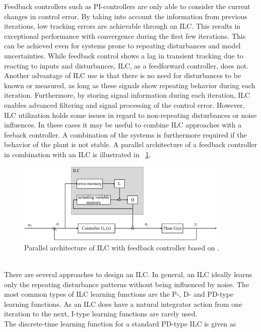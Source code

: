  Feedback controllers such as PI-controllers are only able to consider the current changes in control error. By taking into account the information from previous iterations, low tracking errors are achievable through an ILC. This results in exceptional performance with convergence during the first few iterations. This can be achieved even for systems prone to repeating disturbances and model uncertainties. While feedback control shows a lag in transient tracking due to reacting to inputs and disturbances, ILC, as a feedforward controller, does not. Another advantage of ILC use is that there is no need for disturbances to be known or measured, as long as these signals show repeating behavior during each iteration. Furthermore, by storing signal information during each iteration, ILC enables advanced filtering and signal processing of the control error. However, ILC utilization holds some issues in regard to non-repeating disturbances or noise influences. In these cases it may be useful to combine ILC approaches with a feeback controller. A combination of the systems is furthermore required if the behavior of the plant is not stable. \cite{ILC2} A parallel architecture of a feedback controller in combination with an ILC is illustrated in \figurename~\ref{fig:ILC_parallel}.
 \begin{figure}[ht]
    \centering
    \includegraphics[width=0.9\textwidth]{images/chapt_3/ILC_parallel.pdf}
    \caption[Parallel architecture of ILC with feedback controller]{Parallel architecture of ILC with feedback controller based on \cite{ILC2}.}
    \label{fig:ILC_parallel}
  \end{figure}
\\There are several approaches to design an ILC. In general, an ILC ideally learns only the repeating disturbance patterns without being influenced by noise. The most common types of ILC learning functions are the P-, D- and PD-type learning functions. As an ILC does have a natural integrator action from one iteration to the next, I-type learning functions are rarely used.
\\The discrete-time learning function for a standard PD-type ILC is given as
